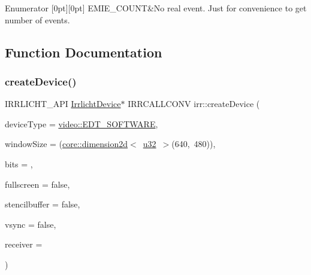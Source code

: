 \begin{DoxyEnumFields}{Enumerator}
[0pt][0pt]{}\mbox{\label{namespaceirr_a2dbf2a247aa17a9eeefbbf36ebd5739fa2cda06d009d09fc263752310cc64340f}} 
E\+M\+I\+E\+\_\+\+C\+O\+U\+NT&No real event. Just for convenience to get number of events. \\
\hline

\end{DoxyEnumFields}


\subsection{Function Documentation}
\mbox{\label{namespaceirr_abaf4d8719cc26b0d30813abf85e47c76}} 
\subsubsection{\texorpdfstring{create\+Device()}{createDevice()}}
{\footnotesize\ttfamily I\+R\+R\+L\+I\+C\+H\+T\+\_\+\+A\+PI \hyperlink{classirr_1_1IrrlichtDevice}{Irrlicht\+Device}$\ast$ I\+R\+R\+C\+A\+L\+L\+C\+O\+NV irr\+::create\+Device (\begin{DoxyParamCaption}\item[{\hyperlink{namespaceirr_1_1video_ae35a6de6d436c76107ad157fe42356d0}{video\+::\+E\+\_\+\+D\+R\+I\+V\+E\+R\+\_\+\+T\+Y\+PE}}]{device\+Type = {\ttfamily \hyperlink{namespaceirr_1_1video_ae35a6de6d436c76107ad157fe42356d0ad863d9225d42c1f9ea1eb7ad89a712ce}{video\+::\+E\+D\+T\+\_\+\+S\+O\+F\+T\+W\+A\+RE}},  }\item[{const \hyperlink{classirr_1_1core_1_1dimension2d}{core\+::dimension2d}$<$ \hyperlink{namespaceirr_a0416a53257075833e7002efd0a18e804}{u32} $>$ \&}]{window\+Size = {\ttfamily (\hyperlink{classirr_1_1core_1_1dimension2d}{core\+::dimension2d}$<$~\hyperlink{namespaceirr_a0416a53257075833e7002efd0a18e804}{u32}~$>$(640,~480))},  }\item[{\hyperlink{namespaceirr_a0416a53257075833e7002efd0a18e804}{u32}}]{bits = {},  }\item[{bool}]{fullscreen = {\ttfamily false},  }\item[{bool}]{stencilbuffer = {\ttfamily false},  }\item[{bool}]{vsync = {\ttfamily false},  }\item[{\hyperlink{classirr_1_1IEventReceiver}{I\+Event\+Receiver} $\ast$}]{receiver = {} }\end{DoxyParamCaption})}



